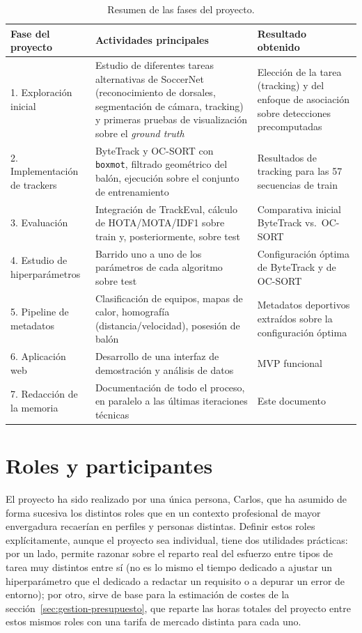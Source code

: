 \begin{table}[htp]
\centering
\caption{Resumen de las fases del proyecto.}
\label{tab:gestion-fases}
\renewcommand{\arraystretch}{1.3}
\begin{tabular}{|p{2.9cm}|p{5.2cm}|p{5.4cm}|}
\hline
\rowcolor{gray!25}
\textbf{Fase del proyecto} & \textbf{Actividades principales} & \textbf{Resultado obtenido} \\
\hline
1. Exploración inicial &
  Estudio de diferentes tareas alternativas de SoccerNet (reconocimiento de dorsales,
  segmentación de cámara, tracking) y primeras pruebas de visualización sobre
  el \emph{ground truth} &
  Elección de la tarea (tracking) y del enfoque de asociación sobre
  detecciones precomputadas \\
\hline
2. Implementación de trackers &
  ByteTrack y OC-SORT con \texttt{boxmot}, filtrado geométrico del balón,
  ejecución sobre el conjunto de entrenamiento &
  Resultados de tracking para las 57 secuencias de train \\
\hline
3. Evaluación &
  Integración de TrackEval, cálculo de HOTA/MOTA/IDF1 sobre train y,
  posteriormente, sobre test &
  Comparativa inicial ByteTrack vs.\ OC-SORT \\
\hline
4. Estudio de hiperparámetros &
  Barrido uno a uno de los parámetros de cada algoritmo sobre test &
  Configuración óptima de ByteTrack y de OC-SORT \\
\hline
5. Pipeline de metadatos &
  Clasificación de equipos, mapas de calor, homografía (distancia/velocidad),
  posesión de balón &
  Metadatos deportivos extraídos sobre la configuración óptima \\
\hline
6. Aplicación web &
  Desarrollo de una interfaz de demostración y análisis de datos &
  MVP funcional \\
\hline
7. Redacción de la memoria &
  Documentación de todo el proceso, en paralelo a las últimas iteraciones
  técnicas &
  Este documento \\
\hline
\end{tabular}
\end{table}

\section{Roles y participantes}
\label{sec:gestion-roles}

El proyecto ha sido realizado por una única persona, Carlos, que ha
asumido de forma sucesiva los distintos roles que en un
contexto profesional de mayor envergadura recaerían en perfiles y personas
distintas. Definir estos roles explícitamente, aunque el proyecto sea
individual, tiene dos utilidades prácticas: por un lado, permite razonar
sobre el reparto real del esfuerzo entre tipos de tarea muy distintos entre
sí (no es lo mismo el tiempo dedicado a ajustar un hiperparámetro que el
dedicado a redactar un requisito o a depurar un error de entorno); por
otro, sirve de base para la estimación de costes de la
sección~\ref{sec:gestion-presupuesto}, que reparte las horas totales del
proyecto entre estos mismos roles con una tarifa de mercado distinta para
cada uno.

